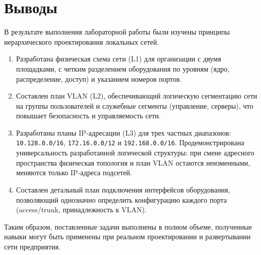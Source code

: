 \newpage
\section{Выводы}
В результате выполнения лабораторной работы были изучены принципы иерархического проектирования локальных сетей.
\begin{enumerate}
    \item Разработана физическая схема сети (L1) для организации с двумя площадками, с четким разделением оборудования по уровням (ядро, распределение, доступ) и указанием номеров портов.
    \item Составлен план VLAN (L2), обеспечивающий логическую сегментацию сети на группы пользователей и служебные сегменты (управление, серверы), что повышает безопасность и управляемость сети.
    \item Разработаны планы IP-адресации (L3) для трех частных диапазонов: \texttt{10.128.0.0/16}, \texttt{172.16.0.0/12} и \texttt{192.168.0.0/16}. Продемонстрирована универсальность разработанной логической структуры: при смене адресного пространства физическая топология и план VLAN остаются неизменными, меняются только IP-адреса подсетей.
    \item Составлен детальный план подключения интерфейсов оборудования, позволяющий однозначно определить конфигурацию каждого порта (access/trunk, принадлежность к VLAN).
\end{enumerate}
Таким образом, поставленные задачи выполнены в полном объеме, полученные навыки могут быть применены при реальном проектировании и развертывании сети предприятия.


